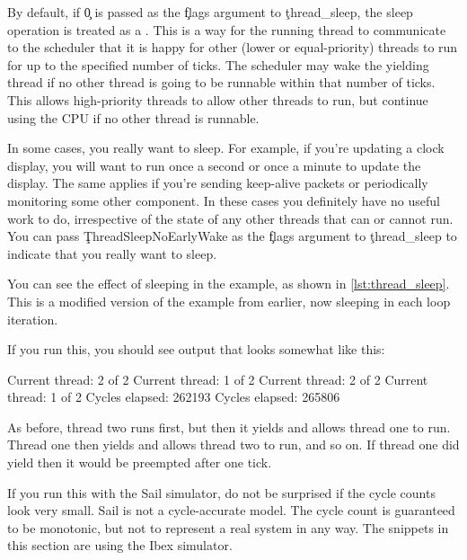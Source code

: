 By default, if \c{0} is passed as the \c{flags} argument to \c{thread_sleep}, the sleep operation is treated as a .
This is a way for the running thread to communicate to the scheduler that it is happy for other (lower or equal-priority) threads to run for up to the specified number of ticks.
The scheduler may wake the yielding thread if no other thread is going to be runnable within that number of ticks.
This allows high-priority threads to allow other threads to run, but continue using the CPU if no other thread is runnable.

In some cases, you really want to sleep.
For example, if you're updating a clock display, you will want to run once a second or once a minute to update the display.
The same applies if you're sending keep-alive packets or periodically monitoring some other component.
In these cases you definitely have no useful work to do, irrespective of the state of any other threads that can or cannot run.
You can pass \c{ThreadSleepNoEarlyWake} as the \c{flags} argument to \c{thread_sleep} to indicate that you really want to sleep.

You can see the effect of sleeping in the  example, as shown in \ref{lst:thread_sleep}.
This is a modified version of the  example from earlier, now sleeping in each loop iteration.

\codelisting[filename=examples/thread_sleep/current.cc,marker=entry,label=lst:thread_sleep,caption="A simple example of thread sleeping"]{}

If you run this, you should see output that looks somewhat like this:

\begin{console}
Current thread: 2 of 2
Current thread: 1 of 2
Current thread: 2 of 2
Current thread: 1 of 2
Cycles elapsed: 262193
Cycles elapsed: 265806
\end{console}

As before, thread two runs first, but then it yields and allows thread one to run.
Thread one then yields and allows thread two to run, and so on.
If thread one did  yield then it would be preempted after one tick.

\begin{note}
If you run this with the Sail simulator, do not be surprised if the cycle counts look very small.
Sail is not a cycle-accurate model. The cycle count is guaranteed to be monotonic, but not to represent a real system in any way.
The snippets in this section are using the Ibex simulator.
\end{note}

